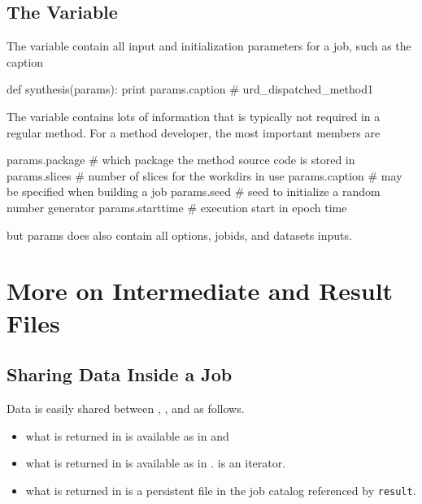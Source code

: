 \subsection{The \params Variable }
The \params variable contain all input and initialization parameters
for a job, such as the caption
\begin{python}
def synthesis(params):
  print params.caption
# urd_dispatched_method1
\end{python}
The \params variable contains lots of information that is typically
not required in a regular method.  For a method developer, the most
important members are
\begin{python}
params.package     # which package the method source code is stored in
params.slices      # number of slices for the workdirs in use
params.caption     # may be specified when building a job
params.seed        # seed to initialize a random number generator
params.starttime   # execution start in epoch time
\end{python}
but params does also contain all options, jobids, and datasets inputs.







\newpage
\section{More on Intermediate and Result Files}

\subsection{Sharing Data Inside a Job}
Data is easily shared between \prepare, \analysis, and \synthesis as
follows.
\begin{itemize}
\item what is returned in \prepare is available as \prepareres in \analysis and \synthesis
\item what is returned in \analysis is available as \analysisres in \synthesis.  \analysisres is an iterator.
\item what is returned in \synthesis is a persistent file in the job catalog referenced by \texttt{result}.
\end{itemize}


